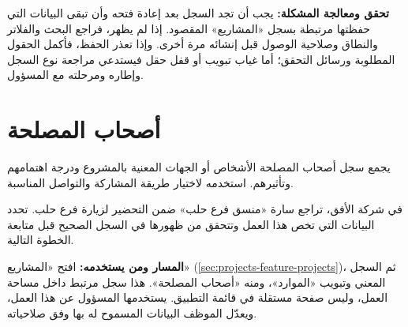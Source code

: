 \textbf{تحقق ومعالجة المشكلة:} يجب أن تجد السجل بعد إعادة فتحه وأن تبقى البيانات التي حفظتها مرتبطة بسجل «المشاريع» المقصود. إذا لم يظهر، فراجع البحث والفلاتر والنطاق وصلاحية الوصول قبل إنشائه مرة أخرى. وإذا تعذر الحفظ، فأكمل الحقول المطلوبة ورسائل التحقق؛ أما غياب تبويب أو قفل حقل فيستدعي مراجعة نوع السجل وإطاره ومرحلته مع المسؤول.

\clearpage
\section{أصحاب المصلحة}
\label{sec:projects-feature-stakeholders}

يجمع سجل أصحاب المصلحة الأشخاص أو الجهات المعنية بالمشروع ودرجة اهتمامهم وتأثيرهم. استخدمه لاختيار طريقة المشاركة والتواصل المناسبة.

\begin{rcnote}
في شركة الأفق، تراجع سارة «منسق فرع حلب» ضمن التحضير لزيارة فرع حلب. تحدد البيانات التي تخص هذا العمل وتتحقق من ظهورها في السجل الصحيح قبل متابعة الخطوة التالية.
\end{rcnote}

\textbf{المسار ومن يستخدمه:} افتح «المشاريع» (\ref{sec:projects-feature-projects})، ثم السجل المعني وتبويب «الموارد»، ومنه «أصحاب المصلحة». هذا سجل مرتبط داخل مساحة العمل، وليس صفحة مستقلة في قائمة التطبيق. يستخدمها المسؤول عن هذا العمل، ويعدّل الموظف البيانات المسموح له بها وفق صلاحياته.

